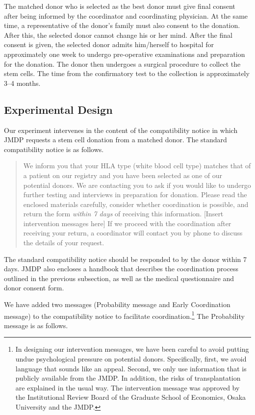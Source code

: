 \documentclass[
]{article}
\begin{document}
The matched donor who is selected as the best donor must give final consent after being informed by the coordinator and coordinating physician. At the same time, a representative of the donor's family must also consent to the donation. After this, the selected donor cannot change his or her mind. After the final consent is given, the selected donor admits him/herself to hospital for approximately one week to undergo pre-operative examinations and preparation for the donation. The donor then undergoes a surgical procedure to collect the stem cells. The time from the confirmatory test to the collection is approximately 3--4 months.

\hypertarget{design}{%
\subsection{Experimental Design}\label{design}}

Our experiment intervenes in the content of the compatibility notice in which JMDP requests a stem cell donation from a matched donor. The standard compatibility notice is as follows.

\begin{quote}
We inform you that your HLA type (white blood cell type) matches that of a patient on our registry and you have been selected as one of our potential donors. We are contacting you to ask if you would like to undergo further testing and interviews in preparation for donation. Please read the enclosed materials carefully, consider whether coordination is possible, and return the form \emph{within 7 days} of receiving this information. {[}Insert intervention messages here{]} If we proceed with the coordination after receiving your return, a coordinator will contact you by phone to discuss the details of your request.
\end{quote}

The standard compatibility notice should be responded to by the donor within 7 days. JMDP also encloses a handbook that describes the coordination process outlined in the previous subsection, as well as the medical questionnaire and donor consent form.

We have added two messages (Probability message and Early Coordination message) to the compatibility notice to facilitate coordination.\footnote{In designing our intervention messages, we have been careful to avoid putting undue psychological pressure on potential donors. Specifically, first, we avoid language that sounds like an appeal. Second, we only use information that is publicly available from the JMDP. In addition, the risks of transplantation are explained in the usual way. The intervention message was approved by the Institutional Review Board of the Graduate School of Economics, Osaka University and the JMDP.} The Probability message is as follows.
\end{document}

